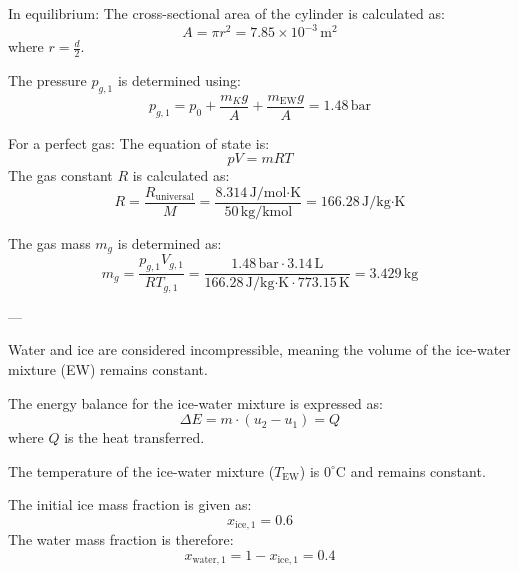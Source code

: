 In equilibrium:  
The cross-sectional area of the cylinder is calculated as:  
\[
A = \pi r^2 = 7.85 \times 10^{-3} \, \text{m}^2
\]  
where \( r = \frac{d}{2} \).  

The pressure \( p_{g,1} \) is determined using:  
\[
p_{g,1} = p_0 + \frac{m_K g}{A} + \frac{m_{\text{EW}} g}{A} = 1.48 \, \text{bar}
\]  

For a perfect gas:  
The equation of state is:  
\[
p V = m R T
\]  
The gas constant \( R \) is calculated as:  
\[
R = \frac{R_{\text{universal}}}{M} = \frac{8.314 \, \text{J/mol·K}}{50 \, \text{kg/kmol}} = 166.28 \, \text{J/kg·K}
\]  

The gas mass \( m_g \) is determined as:  
\[
m_g = \frac{p_{g,1} V_{g,1}}{R T_{g,1}} = \frac{1.48 \, \text{bar} \cdot 3.14 \, \text{L}}{166.28 \, \text{J/kg·K} \cdot 773.15 \, \text{K}} = 3.429 \, \text{kg}
\]  

---

Water and ice are considered incompressible, meaning the volume of the ice-water mixture (EW) remains constant.  

The energy balance for the ice-water mixture is expressed as:  
\[
\Delta E = m \cdot (u_2 - u_1) = Q
\]  
where \( Q \) is the heat transferred.  

The temperature of the ice-water mixture (\( T_{\text{EW}} \)) is \( 0^\circ\text{C} \) and remains constant.  

The initial ice mass fraction is given as:  
\[
x_{\text{ice},1} = 0.6
\]  
The water mass fraction is therefore:  
\[
x_{\text{water},1} = 1 - x_{\text{ice},1} = 0.4
\]